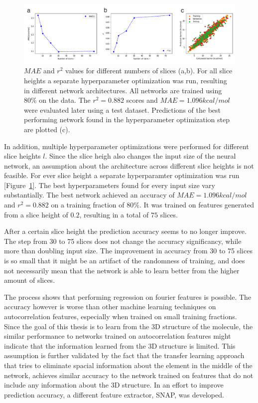 \begin{figure}[H]
    \includegraphics[width=1.0\textwidth]{figures/regression/fourier/slice-exp.png}
    \caption[Evaluation of LEFD models]{
      $MAE$ and $r^2$ values for different numbers of slices (a,b).
      For all slice heights a separate hyperparameter optimization was run, resulting in different network architectures.
      All networks are trained using 80\% on the data. The $r^2=0.882$ scores and $MAE=1.096 kcal/mol$ were evaluated later using a test dataset.
      Predictions of the best performing network found in the hyperparameter optimization step are plotted (c).
    }
    \label{fig:fourier_final}
\end{figure}


In addition, multiple hyperparameter optimizations were performed for different slice heights $l$.
Since the slice heigh also changes the input size of the neural network, an assumption about the 
architecture across different slice heights is not feasible.
For ever slice height a separate hyperparamter optimization was run [Figure~\ref{fig:fourier_final}].
The best hyperparameters found for every input size vary substantially.
The best network achieved an accuracy of $MAE=1.096 kcal/mol$ and $r^2=0.882$ on a training fraction of 80\%.
It was trained on features generated from a slice height of $0.2$, resulting in a total of $75$ slices.

After a certain slice height the prediction accuracy seems to no longer improve.
The step from 30 to 75 slices does not change the accuracy significancy, while more than doubling input size.
The improvement in accuracy from 30 to 75 slices is so small that it might be an artifact of the 
randomness of training, and does not necessarily mean that the network is able to learn better from the higher amount of slices.



The process shows that performing regression on fourier features is possible.
The accuracy however is worse than other machine learning techniques on autocorrelation features, especially when trained on small training fractions.
Since the goal of this thesis is to learn from the 3D structure of the molecule, the similar performance to networks trained on autocorrelation features
might indicate that the information learned from the 3D structure is limited.
This assumption is further validated by the fact that the transfer learning approach that 
tries to eliminate spacial information about the element in the middle of the network, achieves similar accuracy to the 
network trained on features that do not include any information about the 3D structure.
In an effort to improve prediction accuracy, a different feature extractor, SNAP, was developed.








